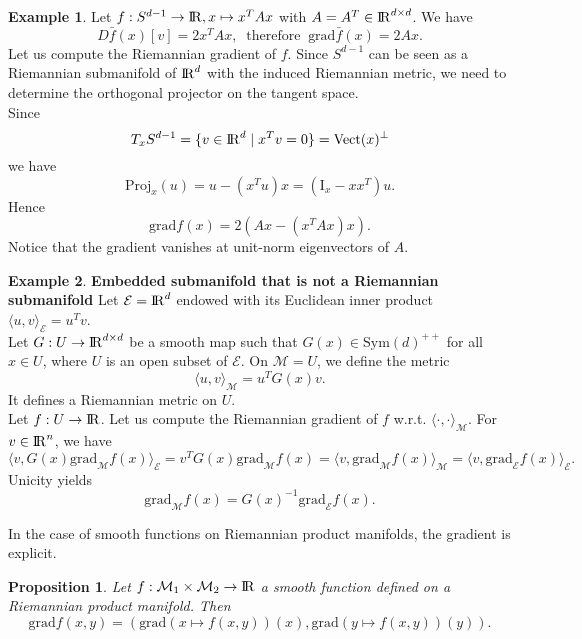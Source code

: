 \documentclass[10pt,a4paper]{book}
\theoremstyle{definition}
\newtheorem{exm}{Example}[section]
\theoremstyle{plain}
\newtheorem{prop}{Proposition}[section]
\theoremstyle{remark}
\newcommand{\grad}{\textrm{grad}}
\newcommand{\E}{\mathcal{E}}
\newcommand \M {\mathcal{M}}
\def\R{{\rm I\kern-0.16em R}}
\begin{document}
\begin{exm}
Let $f:S^{d-1}\to \R, x\mapsto x^{T}Ax$ with $A=A^{T} \in \R^{d\times d}$. We have  $$D\bar{f}(x)[v]=2x^{T}Ax,~\text{ therefore }~\grad \bar{f}(x)=2Ax.$$ Let us compute the Riemannian gradient of $f$. Since $S^{d-1}$ can be seen as a Riemannian submanifold of $\R^d$ with the induced Riemannian metric, we need to determine the orthogonal projector on the tangent space.\\ Since
$$T_xS^{d-1}=\{v\in \R^d \mid x^{T}v=0\}= \text{Vect}(x)^{\bot}$$
we have
$$\text{Proj}_x(u)=u-(x^{T}u)x=(\text{I}_x-xx^{T})u.$$
Hence
$$\grad f(x)=2(Ax-(x^{T}Ax)x).$$
Notice that the gradient vanishes at unit-norm eigenvectors of $A$.
\end{exm}
\begin{exm}\textbf{Embedded submanifold that is not a Riemannian submanifold}
Let $\E=\R^d$ endowed with its Euclidean inner product $\langle u,v \rangle_{\E}=u^Tv$. \\ Let $G:U\to \R^{d\times d}$ be a smooth map such that $G(x)\in \text{Sym}(d)^{++}$ for all $x\in U$, where $U$ is an open subset of $\E$. On $\M=U$, we define the metric
$$\langle u,v\rangle_{\M}=u^TG(x)v.$$
It defines a Riemannian metric on $U$. \\ Let $f:U\to \R$. Let us compute the Riemannian gradient of $f$ w.r.t. $\langle \cdot, \cdot \rangle_{\M}$. For $v\in \R^n$, we have
$$\langle v,G(x)\grad_{\M}f(x)\rangle_{\E}=v^{T}G(x) \grad_{\M}f(x)=\langle v,\grad_{\M}f(x)\rangle_{\M}=\langle v,\grad_{\E}f(x)\rangle_{\E}.$$
Unicity yields
$$\grad_{\M}f(x)=G(x)^{-1}\grad_{\E}f(x).$$
\end{exm}
In the case of smooth functions on Riemannian product manifolds, the gradient is explicit.
\begin{prop}
Let $f:\M_1\times \M_2\to \R$ a smooth function defined on a Riemannian product manifold. Then
$$\grad f(x,y)=\left(\grad(x\mapsto f(x,y))(x),\grad(y\mapsto f(x,y))(y)\right).$$
\end{prop}
\end{document}
